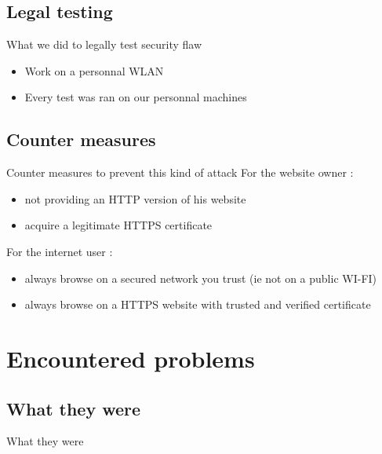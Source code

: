 \documentclass{beamer}
\begin{document}
\subsection{Legal testing}
\begin{frame}{What we did to legally test security flaw}
	\begin{itemize}
		\pause \item Work on a personnal WLAN\\
		\pause \item Every test was ran on our personnal machines\\
	\end{itemize}
\end{frame}

\subsection{Counter measures}
\begin{frame}{Counter measures to prevent this kind of attack}
For the website owner : \\
	\begin{itemize}
		\pause \item not providing an HTTP version of his website\\
		\pause \item acquire a legitimate HTTPS certificate\\
	\end{itemize}
\pause For the internet user : \\
	\begin{itemize}
		\pause \item always browse on a secured network you trust (ie not on a public WI-FI)\\
		\pause \item always browse on a HTTPS website with trusted and verified certificate\\
	\end{itemize}
\end{frame}

\section{Encountered problems}

\subsection{What they were}
\begin{frame}{What they were}

\end{frame}
\end{document}
